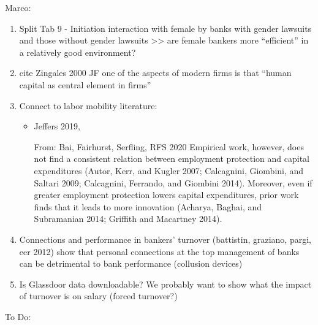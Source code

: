 Marco: 
\begin{enumerate}
	\item Split Tab 9 - Initiation interaction with female by banks with gender lawsuits and those without gender lawsuits >> are female bankers more ``efficient'' in a relatively good environment? 
	\item cite Zingales 2000 JF one of the aspects of modern firms is that ``human capital as central element in firms''
	\item Connect to labor mobility literature:
	\begin{itemize}
		\item Jeffers 2019, 
		\item [From: Bai, Fairhurst, Serfling, RFS 2020] Empirical work, however, does not find a consistent relation between employment protection and capital expenditures (Autor, Kerr, and Kugler 2007; Calcagnini, Giombini, and Saltari 2009; Calcagnini, Ferrando, and Giombini 2014). Moreover, even if greater employment protection lowers capital expenditures, prior work finds that it leads to more innovation (Acharya, Baghai, and Subramanian 2014; Griffith and Macartney 2014). 
	\end{itemize}	
	\item Connections and performance in bankers’ turnover (battistin, graziano, pargi, eer 2012) show that personal connections at the top management of banks can be detrimental to bank performance (collusion devices)
	\item Is Glassdoor data downloadable? We probably want to show what the impact of turnover is on salary (forced turnover?)
\end{enumerate}

To Do:



